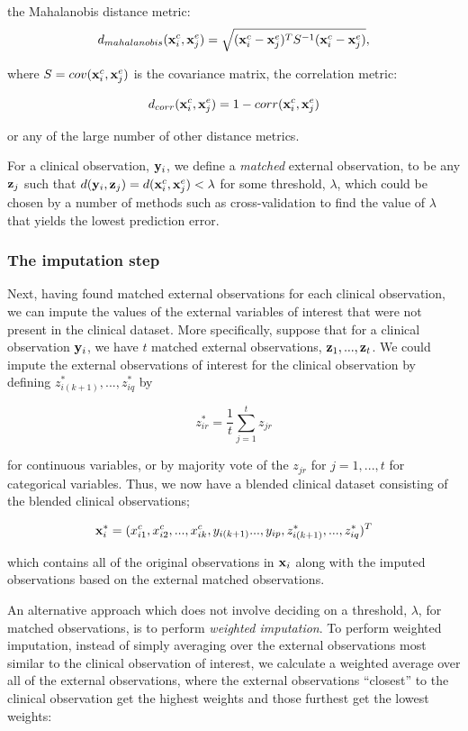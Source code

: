 \documentclass{article}
\begin{document}
the Mahalanobis distance metric:
$$d_{mahalanobis}({\bf x}_i^c, {\bf x}_j^e) = \sqrt{({\bf x}_i^c - {\bf x}_j^e)^T S^{-1}({\bf x}_i^c - {\bf x}_j^e)},$$

where $S = cov({\bf x}_i^c, {\bf x}_j^e)$ is the covariance matrix, the correlation metric:

$$d_{corr}({\bf x}_i^c, {\bf x}_j^e) = 1 - corr({\bf x}_i^c, {\bf x}_j^e)$$

or any of the large number of other distance metrics.


For a clinical observation, ${\bf y}_i$, we define a \emph{matched} external observation, to be any ${\bf z}_j$ such that $d({\bf y}_i, {\bf z}_j) = d({\bf x}^c_i, {\bf x}^e_j) < \lambda$ for some threshold, $\lambda$, which could be chosen by a number of methods such as cross-validation to find the value of $\lambda$ that yields the lowest prediction error. 

\subsubsection{The imputation step}


Next, having found matched external observations for each clinical observation, we can impute the values of the external variables of interest that were not present in the clinical dataset. More specifically, suppose that for a clinical observation ${\bf y}_i$, we have $t$ matched external observations, ${\bf z}_1, ..., {\bf z}_t$. We could impute the external observations of interest for the clinical observation by  defining $z^*_{i(k+1)}, ..., z^*_{iq}$ by

$$z^*_{ir} = \frac{1}{t} \sum_{j=1}^t z_{jr}$$

for continuous variables, or by majority vote of the $z_{jr}$ for $j = 1, ..., t$ for categorical variables. Thus, we now have a blended clinical dataset consisting of the blended clinical observations;

$${\bf x}^*_i = (x^c_{i1}, x^c_{i2}, ..., x^c_{ik}, y_{i(k+1)} ..., y_{ip}, z_{i(k+1)}^*, ..., z_{iq}^*)^T$$

which contains all of the original observations in ${\bf x}_i$ along with the imputed observations based on the external matched observations.

An alternative approach which does not involve deciding on a threshold, $\lambda$, for matched observations, is to perform \emph{weighted imputation}. To perform weighted imputation, instead of simply averaging over the external observations most similar to the clinical observation of interest, we calculate a weighted average over all of the external observations, where the external observations ``closest'' to the clinical observation get the highest weights and those furthest get the lowest weights:
\end{document}
